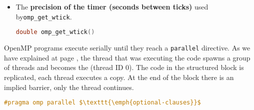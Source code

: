 \begin{itemize}
    \item The \textbf{precision of the timer (seconds between ticks)} used by\break \texttt{omp\_get\_wtick}.
    \begin{openmpbox}
    	\begin{lstlisting}[language=C++]
double omp_get_wtick()\end{lstlisting}
    \end{openmpbox}
\end{itemize}

\highspace
OpenMP programs execute serially until they reach a \texttt{parallel} directive. As we have explained at page \pageref{figure: how OpenMP works}, the thread that was executing the code spawns a group of  threads and becomes the  (thread ID 0). The code in the structured block is replicated, each thread executes a copy. At the end of the block there is an implied barrier, only the  thread continues.
\begin{openmpbox}
\begin{lstlisting}[language=C++, mathescape=true]
#pragma omp parallel $\texttt{\emph{optional-clauses}}$\end{lstlisting}
\end{openmpbox}

